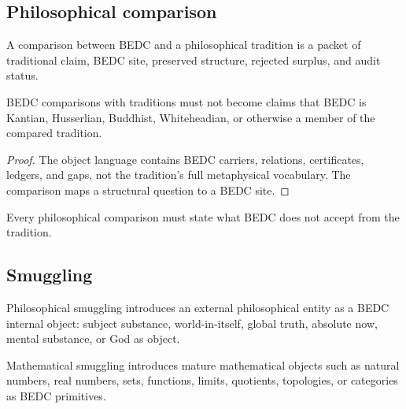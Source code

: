 \subsection{Philosophical comparison}
\label{subsec:philosophy-comparison-discipline}

\begin{definition}
\label{def:philosophy-tradition-map-discipline}
A comparison between BEDC and a philosophical tradition is a packet of
traditional claim, BEDC site, preserved structure, rejected surplus, and
audit status.
\end{definition}

\begin{theorem}
\label{thm:philosophy-comparisons-not-membership}
BEDC comparisons with traditions must not become claims that BEDC is
Kantian, Husserlian, Buddhist, Whiteheadian, or otherwise a member of
the compared tradition.
\end{theorem}
\begin{proof}
The object language contains BEDC carriers, relations, certificates,
ledgers, and gaps, not the tradition's full metaphysical vocabulary.
The comparison maps a structural question to a BEDC site.
\end{proof}

\begin{corollary}
\label{cor:philosophy-rejected-surplus-mandatory}
Every philosophical comparison must state what BEDC does not accept
from the tradition.
\end{corollary}

\subsection{Smuggling}
\label{subsec:philosophy-smuggling-discipline}

\begin{definition}
\label{def:philosophy-philosophical-smuggling}
Philosophical smuggling introduces an external philosophical entity as
a BEDC internal object: subject substance, world-in-itself, global
truth, absolute now, mental substance, or God as object.
\end{definition}

\begin{definition}
\label{def:philosophy-mathematical-smuggling}
Mathematical smuggling introduces mature mathematical objects such as
natural numbers, real numbers, sets, functions, limits, quotients,
topologies, or categories as BEDC primitives.
\end{definition}

